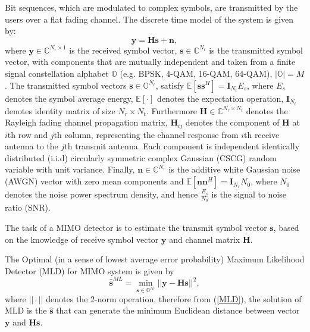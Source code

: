 \documentclass[12pt, draftclsnofoot, onecolumn]{IEEEtran}
\begin{document}
Bit sequences, which are modulated to complex symbols, are transmitted by the users over a flat fading channel. The discrete time model of the system is given by:
\begin{equation}
\mathbf{y}=\mathbf{H}\mathbf{s}+\mathbf{n},   \label{discrete time MIMO system}
\end{equation}
where $\mathbf{y}\in\mathbb{C}^{N_{r}\times 1}$ is the received symbol vector, $\mathbf{s}\in \mathbb{C}^{N_{t}}$ is the transmitted symbol vector, with components that are mutually independent and taken from a finite signal constellation alphabet $\mathbb{O}$ (e.g. BPSK, 4-QAM, 16-QAM, 64-QAM), $|\mathbb{O}|=M$. The transmitted symbol vectors $\mathbf{s}\in \mathbb{O}^{N_{t}}$, satisfy $\mathbb{E}[\mathbf{s}\mathbf{s}^{H}]=\mathbf{I}_{N_t}E_{s}$, where $E_{s}$ denotes the symbol average energy, $\mathbb{E}[\cdot]$ denotes the expectation operation, $\mathbf{I}_{N_{t}}$ denotes identity matrix of size $N_{r}\times N_{t}$. Furthermore $\mathbf{H}\in \mathbb{C}^{N_{r}\times N_{t}}$ denotes the Rayleigh fading channel propagation matrix, $\mathbf{H}_{ij}$ denotes the component of $\mathbf{H}$ at $i$th row and $j$th column, representing the channel response from $i$th receive antenna to the $j$th transmit antenna. Each component is independent identically distributed (i.i.d) circularly symmetric complex Gaussian (CSCG) random variable with unit variance. Finally, $\mathbf{n}\in \mathbb{C}^{N_{r}}$ is the additive white Gaussian noise (AWGN) vector with zero mean components and $\mathbb{E}[\mathbf{n}\mathbf{n}^{H}]=\mathbf{I}_{N_{r}}N_{0}$, where $N_{0}$ denotes the noise power spectrum density, and hence $\frac{E_{s}}{N_{0}}$ is the signal to noise ratio (SNR). 

The task of a MIMO detector is to estimate the transmit symbol vector $\mathbf{s}$, based on the knowledge of receive symbol vector $\mathbf{y}$ and channel matrix $\mathbf{H}$.

The Optimal (in a sense of lowest average error probability) Maximum Likelihood Detector (MLD) for MIMO system is given by
\begin{equation}
\hat{\mathbf{s}}^{ML}=\min_{\mathbf{s}\in \mathbb{O}^{N_{t}}}||\mathbf{y}-\mathbf{H}\mathbf{s}||^{2},
\label{MLD}
\end{equation}
where $||\cdot||$ denotes the 2-norm operation, therefore from (\ref{MLD}), the solution of MLD is the $\hat{\mathbf{s}}$ that can generate the minimum Euclidean distance between vector $\mathbf{y}$ and $\mathbf{H}\mathbf{s}$.
\end{document}
